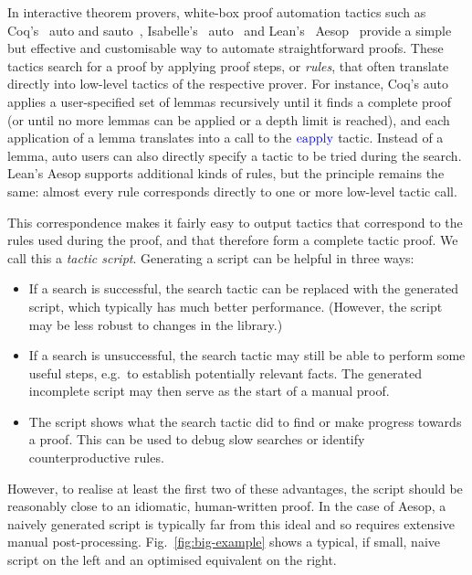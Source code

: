 \documentclass[sigplan,10pt,anonymous,review]{acmart}
\newcommand{\tac}[1]{\ensuremath{\mathrm{\mathcolor{blue}{#1}}}}
\begin{document}
In interactive theorem provers, white-box proof automation tactics such as Coq's~\cite{Coq} auto and sauto~\cite{sauto}, Isabelle's~\cite{Isabelle} auto~\cite{IsabelleAuto} and Lean's~\cite{Lean4} Aesop~\cite{Aesop} provide a simple but effective and customisable way to automate straightforward proofs.
These tactics search for a proof by applying proof steps, or \emph{rules}, that often translate directly into low-level tactics of the respective prover.
For instance, Coq's auto applies a user-specified set of lemmas recursively until it finds a complete proof (or until no more lemmas can be applied or a depth limit is reached), and each application of a lemma translates into a call to the \tac{eapply} tactic.
Instead of a lemma, auto users can also directly specify a tactic to be tried during the search.
Lean's Aesop supports additional kinds of rules, but the principle remains the same: almost every rule corresponds directly to one or more low-level tactic call.

This correspondence makes it fairly easy to output tactics that correspond to the rules used during the proof, and that therefore form a complete tactic proof.
We call this a \emph{tactic script}.
Generating a script can be helpful in three ways:
\begin{itemize}
  \item If a search is successful, the search tactic can be replaced with the generated script, which typically has much better performance.
        (However, the script may be less robust to changes in the library.)
  \item If a search is unsuccessful, the search tactic may still be able to perform some useful steps, e.g.\ to establish potentially relevant facts.
        The generated incomplete script may then serve as the start of a manual proof.
  \item The script shows what the search tactic did to find or make progress towards a proof.
        This can be used to debug slow searches or identify counterproductive rules.
\end{itemize}

However, to realise at least the first two of these advantages, the script should be reasonably close to an idiomatic, human-written proof.
In the case of Aesop, a naively generated script is typically far from this ideal and so requires extensive manual post-processing.
Fig.~\ref{fig:big-example} shows a typical, if small, naive script on the left and an optimised equivalent on the right.
\end{document}
